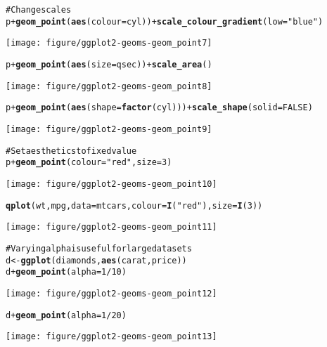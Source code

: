 \documentclass[a4paper,titlepage]{tufte-handout}\usepackage{graphicx, color}
\makeatletter
\def\maxwidth{ %
  \ifdim\Gin@nat@width>\linewidth
    \linewidth
  \else
    \Gin@nat@width
  \fi
}
\newcommand{\hlfunctioncall}[1]{\textcolor[rgb]{0.501960784313725,0,0.329411764705882}{\textbf{#1}}}%
\newcommand{\hlstring}[1]{\textcolor[rgb]{0.6,0.6,1}{#1}}%
\newcommand{\hlcomment}[1]{\textcolor[rgb]{0.180392156862745,0.6,0.341176470588235}{#1}}%
\newenvironment{kframe}{%
 \def\at@end@of@kframe{}%
 \ifinner\ifhmode%
  \def\at@end@of@kframe{\end{minipage}}%
  \begin{minipage}{\columnwidth}%
 \fi\fi%
 \def\FrameCommand##1{\hskip\@totalleftmargin \hskip-\fboxsep
 \colorbox{shadecolor}{##1}\hskip-\fboxsep
     \hskip-\linewidth \hskip-\@totalleftmargin \hskip\columnwidth}%
 \MakeFramed {\advance\hsize-\width
   \@totalleftmargin\z@ \linewidth\hsize
   \@setminipage}}%
 {\par\unskip\endMakeFramed%
 \at@end@of@kframe}
\newenvironment{knitrout}{}{} %
\makeatother
\begin{document}
\begin{knitrout}
\begin{kframe}
\begin{alltt}
\hlcomment{# Change scales}
p + \hlfunctioncall{geom_point}(\hlfunctioncall{aes}(colour = cyl)) + \hlfunctioncall{scale_colour_gradient}(low = \hlstring{"blue"})
\end{alltt}
\end{kframe}\texttt{[image: figure/ggplot2-geoms-geom\_point7]} \begin{kframe}\begin{alltt}
p + \hlfunctioncall{geom_point}(\hlfunctioncall{aes}(size = qsec)) + \hlfunctioncall{scale_area}()
\end{alltt}
\end{kframe}\texttt{[image: figure/ggplot2-geoms-geom\_point8]} \begin{kframe}\begin{alltt}
p + \hlfunctioncall{geom_point}(\hlfunctioncall{aes}(shape = \hlfunctioncall{factor}(cyl))) + \hlfunctioncall{scale_shape}(solid = FALSE)
\end{alltt}
\end{kframe}\texttt{[image: figure/ggplot2-geoms-geom\_point9]} \begin{kframe}\begin{alltt}
\hlcomment{# Set aesthetics to fixed value}
p + \hlfunctioncall{geom_point}(colour = \hlstring{"red"}, size = 3)
\end{alltt}
\end{kframe}\texttt{[image: figure/ggplot2-geoms-geom\_point10]} \begin{kframe}\begin{alltt}
\hlfunctioncall{qplot}(wt, mpg, data = mtcars, colour = \hlfunctioncall{I}(\hlstring{"red"}), size = \hlfunctioncall{I}(3))
\end{alltt}
\end{kframe}\texttt{[image: figure/ggplot2-geoms-geom\_point11]} \begin{kframe}\begin{alltt}
\hlcomment{# Varying alpha is useful for large datasets}
d <- \hlfunctioncall{ggplot}(diamonds, \hlfunctioncall{aes}(carat, price))
d + \hlfunctioncall{geom_point}(alpha = 1/10)
\end{alltt}
\end{kframe}\texttt{[image: figure/ggplot2-geoms-geom\_point12]} \begin{kframe}\begin{alltt}
d + \hlfunctioncall{geom_point}(alpha = 1/20)
\end{alltt}
\end{kframe}\texttt{[image: figure/ggplot2-geoms-geom\_point13]} \begin{kframe}\begin{alltt}

\end{alltt}
\end{kframe}
\end{knitrout}
\end{document}
